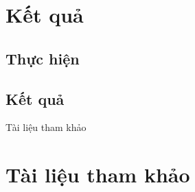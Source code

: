 \documentclass{beamer}
\begin{document}
\section{Kết quả}
\subsection{Thực hiện}
\subsection{Kết quả}
\begin{frame}{Tài liệu tham khảo}
\section*{Tài liệu tham khảo}

\end{frame}
\end{document}
